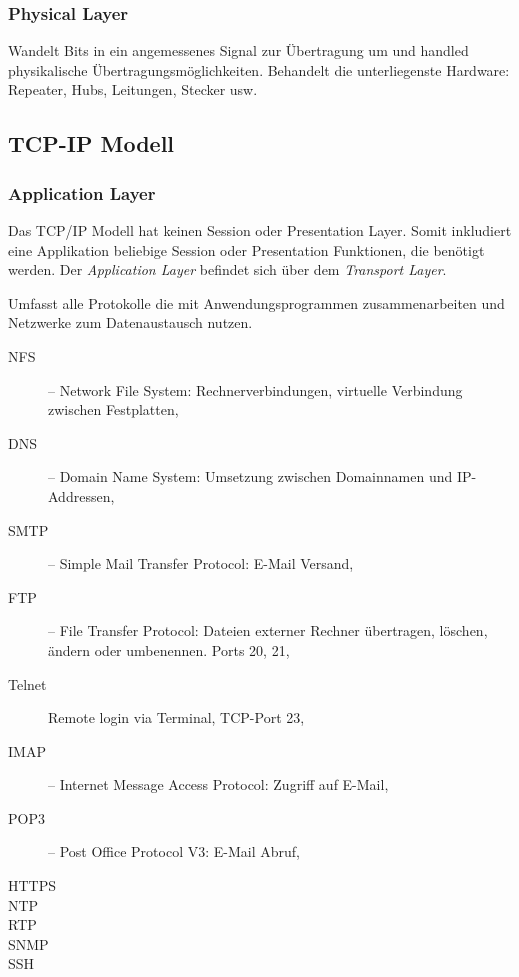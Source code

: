 \documentclass{scrartcl}
\begin{document}
    \subsubsection{Physical Layer}
    \label{OSI:physical_layer}
    Wandelt Bits in ein angemessenes Signal zur Übertragung um und handled physikalische Übertragungsmöglichkeiten. 
    Behandelt die unterliegenste Hardware: Repeater, Hubs, Leitungen, Stecker usw.
    
    \subsection{TCP-IP Modell}
    \subsubsection{Application Layer}
    \label{TCP/IP:application_layer}
    Das TCP/IP Modell hat keinen Session oder Presentation Layer. 
    Somit inkludiert eine  Applikation beliebige Session oder Presentation Funktionen, die benötigt werden.
    Der \emph{Application Layer} befindet sich über dem \emph{Transport Layer}.
    
    Umfasst alle Protokolle die mit Anwendungsprogrammen zusammenarbeiten und Netzwerke zum Datenaustausch nutzen.

    \begin{description}
        \item [NFS] -- Network File System: Rechnerverbindungen, virtuelle Verbindung zwischen Festplatten,
        \item [DNS] -- Domain Name System: Umsetzung zwischen Domainnamen und IP-Addressen,
        \item [SMTP] -- Simple Mail Transfer Protocol: E-Mail Versand,
        \item [FTP] -- File Transfer Protocol: Dateien externer Rechner übertragen, löschen, ändern oder umbenennen. Ports 20, 21,
        \item [Telnet] Remote login via Terminal, TCP-Port 23,
        \item [IMAP] -- Internet Message Access Protocol: Zugriff auf E-Mail,
        \item [POP3] -- Post Office Protocol V3: E-Mail Abruf,
        \item [HTTPS]
        \item [NTP]
        \item [RTP]
        \item [SNMP]
        \item [SSH]
    \end{description}
    
\end{document}
